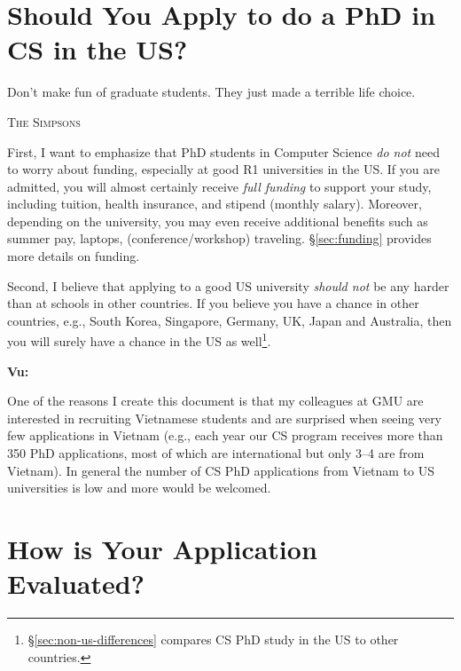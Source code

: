\documentclass[11pt]{article}
\newenvironment{commentbox}[1][]{
\small
    \begin{mybox}
    {\small \textbf{#1}}
 }{
   \end{mybox}
}
\begin{document}
\section{Should You Apply to do a PhD in CS in the US?}\label{sec:should}

\epigraph{\vspace{-0.2in} Don't make fun of graduate students. They just made a terrible life choice.}{\textsc{The Simpsons}}

First, I want to emphasize that PhD students in Computer Science \emph{do not} need to worry about funding, especially at good R1
universities in the US. If you are admitted, you will almost certainly
receive \emph{full funding} to support your study, including tuition,
health insurance, and stipend (monthly salary). Moreover, depending on the university,
you may even receive additional benefits such as summer pay, laptops, (conference/workshop) traveling. \S\ref{sec:funding} provides more details on funding.

Second, I believe that applying to a good US university \emph{should not} be any
harder than at schools in other countries. If you believe you have a chance in other countries, e.g., South Korea, Singapore, Germany, UK, Japan and Australia, then you will surely have a chance in the US as well\footnote{\S\ref{sec:non-us-differences} compares CS PhD study in the US to other countries.}.

\begin{commentbox}[Vu:]
One of the reasons I create this document is that my colleagues at GMU are interested in recruiting Vietnamese students and are surprised when seeing very few applications in Vietnam (e.g., each year our CS program receives more than 350 PhD applications, most of which are international but only 3--4 are from Vietnam). In general the number of CS PhD applications from Vietnam to US universities is low and more would be welcomed. 
\end{commentbox}



\section{How is Your Application Evaluated?}\label{sec:evalapps}
\end{document}
